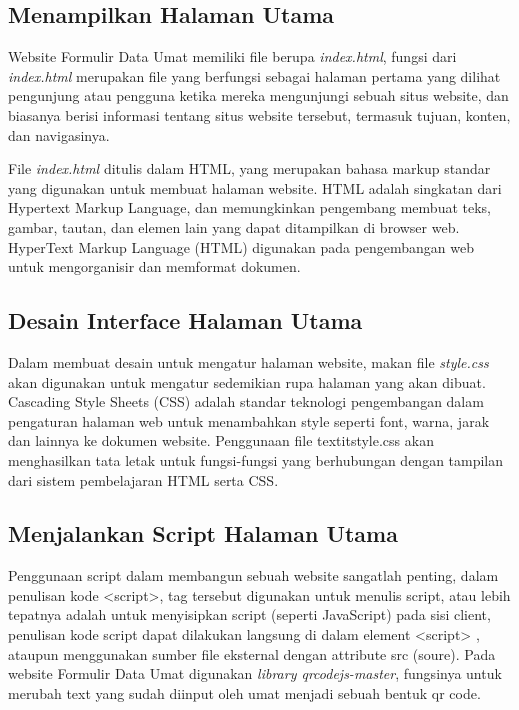 \subsection{Menampilkan Halaman Utama}
\label{sec:index}

Website Formulir Data Umat memiliki file berupa \textit{index.html}, fungsi dari \textit{index.html} merupakan file yang berfungsi sebagai halaman pertama yang dilihat pengunjung atau pengguna ketika mereka mengunjungi sebuah situs website, dan biasanya berisi informasi tentang situs website tersebut, termasuk tujuan, konten, dan navigasinya. 

File \textit{index.html} ditulis dalam HTML, yang merupakan bahasa markup standar yang digunakan untuk membuat halaman website. HTML adalah singkatan dari Hypertext Markup Language, dan memungkinkan pengembang membuat teks, gambar, tautan, dan elemen lain yang dapat ditampilkan di browser web. HyperText Markup Language (HTML) digunakan pada pengembangan web untuk mengorganisir dan memformat dokumen. \cite{indexcssScript}


\subsection{Desain Interface Halaman Utama}
\label{sec:style}

Dalam membuat desain untuk mengatur halaman website, makan file \textit{style.css} akan digunakan untuk mengatur sedemikian rupa halaman yang akan dibuat. Cascading Style Sheets (CSS) adalah standar teknologi pengembangan dalam pengaturan halaman web untuk menambahkan
style seperti font, warna, jarak dan lainnya ke dokumen website. Penggunaan file textit{style.css} akan menghasilkan tata letak untuk fungsi-fungsi yang berhubungan dengan tampilan dari sistem pembelajaran HTML serta CSS. \cite{indexcssScript}

\subsection{Menjalankan Script Halaman Utama}
\label{sec:script}

Penggunaan script dalam membangun sebuah website sangatlah penting, dalam penulisan kode <script>, tag tersebut digunakan untuk menulis script, atau lebih tepatnya adalah untuk menyisipkan script (seperti JavaScript) pada sisi client, penulisan kode script dapat dilakukan langsung di dalam element <script> , ataupun menggunakan sumber file eksternal dengan attribute src (soure). Pada website Formulir Data Umat digunakan \textit{library qrcodejs-master}, fungsinya untuk merubah text yang sudah diinput oleh umat menjadi sebuah bentuk qr code.




